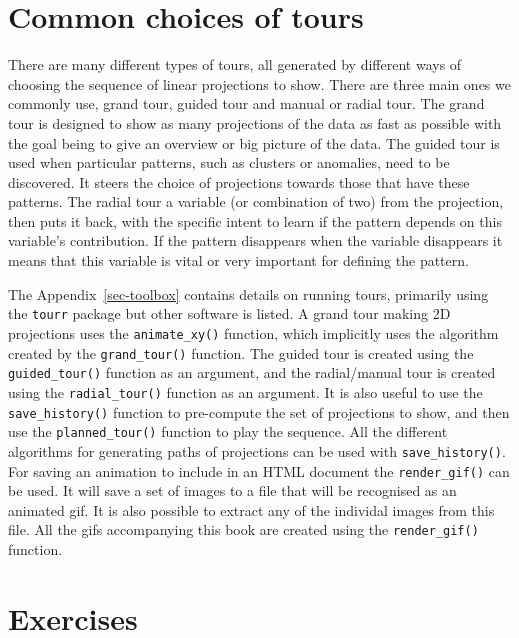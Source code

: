 \documentclass[
  letterpaper,
]{krantz}
\begin{document}
\section{Common choices of tours}\label{common-choices-of-tours}

There are many different types of tours, all generated by different ways
of choosing the sequence of linear projections to show. There are three
main ones we commonly use, grand tour, guided tour and manual or radial
tour. The grand tour is designed to show as many projections of the data
as fast as possible with the goal being to give an overview or big
picture of the data. The guided tour is used when particular patterns,
such as clusters or anomalies, need to be discovered. It steers the
choice of projections towards those that have these patterns. The radial
tour a variable (or combination of two) from the projection, then puts
it back, with the specific intent to learn if the pattern depends on
this variable's contribution. If the pattern disappears when the
variable disappears it means that this variable is vital or very
important for defining the pattern.

The Appendix~\ref{sec-toolbox} contains details on running tours,
primarily using the \texttt{tourr} package but other software is listed.
A grand tour making 2D projections uses the \texttt{animate\_xy()}
function, which implicitly uses the algorithm created by the
\texttt{grand\_tour()} function. The guided tour is created using the
\texttt{guided\_tour()} function as an argument, and the radial/manual
tour is created using the \texttt{radial\_tour()} function as an
argument. It is also useful to use the \texttt{save\_history()} function
to pre-compute the set of projections to show, and then use the
\texttt{planned\_tour()} function to play the sequence. All the
different algorithms for generating paths of projections can be used
with \texttt{save\_history()}. For saving an animation to include in an
HTML document the \texttt{render\_gif()} can be used. It will save a set
of images to a file that will be recognised as an animated gif. It is
also possible to extract any of the individal images from this file. All
the gifs accompanying this book are created using the
\texttt{render\_gif()} function.

\section*{Exercises}\label{exercises}
\end{document}
